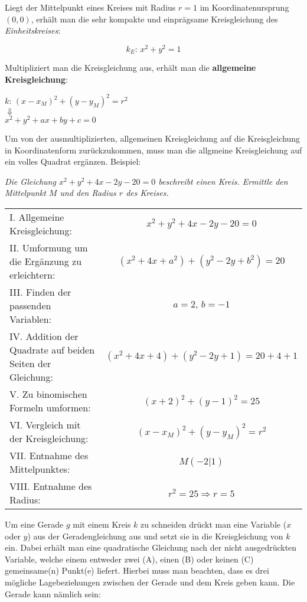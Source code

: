Liegt der Mittelpunkt eines Kreises mit Radius $r = 1$ im Koordinatenursprung $(0, 0)$, erh\"{a}lt man die sehr kompakte und einpr\"{a}gsame Kreisgleichung des \emph{Einheitskreises}:

$$k_{E}:\,x^2 + y^2 = 1$$

Multipliziert man die Kreisgleichung aus, erh\"{a}lt man die \textbf{allgemeine Kreisgleichung}:

\begin{center}
	$k:\, (x - x_{M})^2 + (y - y_{M})^2 = r^2$\\
	$\Downarrow$\\
	$x^2 + y^2 + ax + by + c = 0$
\end{center}

\pagebreak

Um von der ausmultiplizierten, allgemeinen Kreisgleichung auf die Kreisgleichung in Koordinatenform zur\"{u}ckzukommen, muss man die allgmeine Kreisgleichung auf ein volles Quadrat erg\"{a}nzen. Beispiel: \par

\emph{Die Gleichung $x^2 + y^2 + 4x - 2y - 20 = 0$ beschreibt einen Kreis. Ermittle den Mittelpunkt $M$ und den Radius $r$ des Kreises.}

\begin{tabular}{l c}
	I. Allgemeine Kreisgleichung: & $x^2 + y^2 + 4x - 2y - 20 = 0$\\
	II. Umformung um die Erg\"{a}nzung zu erleichtern: & $(x^2 + 4x + a^2) + (y^2 - 2y + b^2) = 20$\\
	III. Finden der passenden Variablen: & $a = 2,\, b = -1$\\
	IV. Addition der Quadrate auf beiden Seiten der Gleichung: & $(x^2 + 4x + 4) + (y^2 - 2y + 1) = 20 + 4 + 1$\\
	V. Zu binomischen Formeln umformen: & $(x + 2)^2 + (y - 1)^2 = 25$\\
	VI. Vergleich mit der Kreisgleichung: & $(x - x_{M})^2 + (y - y_{M})^2 = r^2$\\
	VII. Entnahme des Mittelpunktes: & $M (-2 | 1)$\\
	VIII. Entnahme des Radius: & $r^2 = 25 \Rightarrow r = 5$
\end{tabular}


Um eine Gerade $g$ mit einem Kreis $k$ zu schneiden dr\"{u}ckt man eine Variable ($x$ oder $y$) aus der Geradengleichung aus und setzt sie in die Kreisgleichung von $k$ ein. Dabei erh\"{a}lt man eine quadratische Gleichung nach der nicht ausgedr\"{u}ckten Variable, welche einem entweder zwei (A), einen (B) oder keinen (C) gemeinsame(n) Punkt(e) liefert. Hierbei muss man beachten, dass es drei m\"{o}gliche Lagebeziehungen zwischen der Gerade und dem Kreis geben kann. Die Gerade kann n\"{a}mlich sein:

